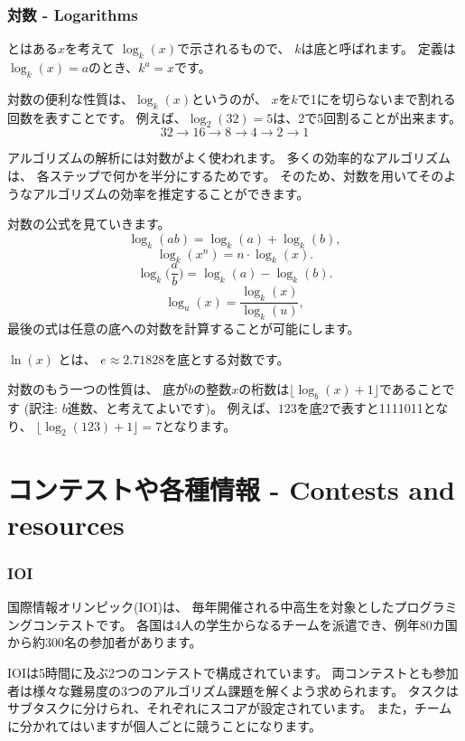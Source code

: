 \subsubsection{対数 - Logarithms}


とはある$x$を考えて
$\log_k(x)$で示されるもので、
$k$は底と呼ばれます。
定義は$\log_k(x)=a$のとき、$k^a=x$です。

対数の便利な性質は、$\log_k(x)$というのが、
$x$を$k$で1にを切らないまで割れる回数を表すことです。
例えば、$\log_2(32)=5$は、2で5回割ることが出来ます。
\[32 \rightarrow 16 \rightarrow 8 \rightarrow 4 \rightarrow 2 \rightarrow 1 \]

アルゴリズムの解析には対数がよく使われます。
多くの効率的なアルゴリズムは、
各ステップで何かを半分にするためです。
そのため、対数を用いてそのようなアルゴリズムの効率を推定することができます。

対数の公式を見ていきます。
\[\log_k(ab) = \log_k(a)+\log_k(b),\]
\[\log_k(x^n) = n \cdot \log_k(x).\]
\[\log_k\Big(\frac{a}{b}\Big) = \log_k(a)-\log_k(b).\]
\[\log_u(x) = \frac{\log_k(x)}{\log_k(u)},\]
最後の式は任意の底への対数を計算することが可能にします。



 $\ln(x)$ とは、
$e \approx 2.71828$を底とする対数です。

対数のもう一つの性質は、
底が$b$の整数$x$の桁数は$\lfloor \log_b(x)+1 \rfloor$であることです
(訳注: $b$進数、と考えてよいです)。
例えば、$123$を底$2$で表すと1111011となり、
$\lfloor \log_2(123)+1 \rfloor = 7$となります。

\section{コンテストや各種情報 - Contests and resources}

\subsubsection{IOI}

国際情報オリンピック(IOI)は、
毎年開催される中高生を対象としたプログラミングコンテストです。
各国は4人の学生からなるチームを派遣でき、例年80カ国から約300名の参加者があります。

IOIは5時間に及ぶ2つのコンテストで構成されています。
両コンテストとも参加者は様々な難易度の3つのアルゴリズム課題を解くよう求められます。
タスクはサブタスクに分けられ、それぞれにスコアが設定されています。
また，チームに分かれてはいますが個人ごとに競うことになります。


